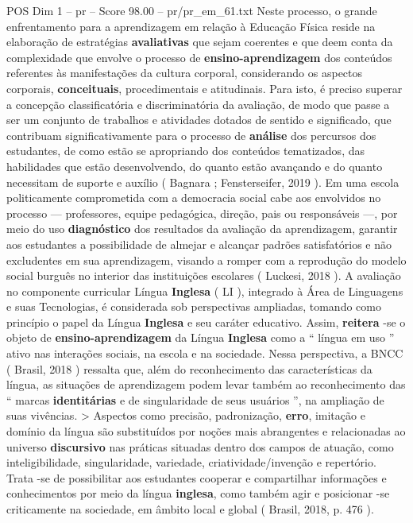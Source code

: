 \begin{textsample}{POS Dim 1 – pr – Score 98.00 – pr/pr\_em\_61.txt}
Neste processo, o grande enfrentamento para a aprendizagem em relação à Educação Física reside na elaboração de estratégias \textbf{avaliativas} que sejam coerentes e que deem conta da complexidade que envolve o processo de \textbf{ensino-aprendizagem} dos conteúdos referentes às manifestações da cultura corporal, considerando os aspectos corporais, \textbf{conceituais}, procedimentais e atitudinais.
Para isto, é preciso superar a concepção classificatória e discriminatória da avaliação, de modo que passe a ser um conjunto de trabalhos e atividades dotados de sentido e significado, que contribuam significativamente para o processo de \textbf{análise} dos percursos dos estudantes, de como estão se apropriando dos conteúdos tematizados, das habilidades que estão desenvolvendo, do quanto estão avançando e do quanto necessitam de suporte e auxílio ( Bagnara ; Fensterseifer, 2019 ).
Em uma escola politicamente comprometida com a democracia social cabe aos envolvidos no processo — professores, equipe pedagógica, direção, pais ou responsáveis —, por meio do uso \textbf{diagnóstico} dos resultados da avaliação da aprendizagem, garantir aos estudantes a possibilidade de almejar e alcançar padrões satisfatórios e não excludentes em sua aprendizagem, visando a romper com a reprodução do modelo social burguês no interior das instituições escolares ( Luckesi, 2018 ).
A avaliação no componente curricular Língua \textbf{Inglesa} ( LI ), integrado à Área de Linguagens e suas Tecnologias, é considerada sob perspectivas ampliadas, tomando como princípio o papel da Língua \textbf{Inglesa} e seu caráter educativo.
Assim, \textbf{reitera} -se o objeto de \textbf{ensino-aprendizagem} da Língua \textbf{Inglesa} como a “ língua em uso ” ativo nas interações sociais, na escola e na sociedade.
Nessa perspectiva, a BNCC ( Brasil, 2018 ) ressalta que, além do reconhecimento das características da língua, as situações de aprendizagem podem levar também ao reconhecimento das “ marcas \textbf{identitárias} e de singularidade de seus usuários ”, na ampliação de suas vivências. > Aspectos como precisão, padronização, \textbf{erro}, imitação e domínio da língua são substituídos por noções mais abrangentes e relacionadas ao universo \textbf{discursivo} nas práticas situadas dentro dos campos de atuação, como inteligibilidade, singularidade, variedade, criatividade/invenção e repertório.
Trata -se de possibilitar aos estudantes cooperar e compartilhar informações e conhecimentos por meio da língua \textbf{inglesa}, como também agir e posicionar -se criticamente na sociedade, em âmbito local e global ( Brasil, 2018, p. 476 ).

\end{textsample}

